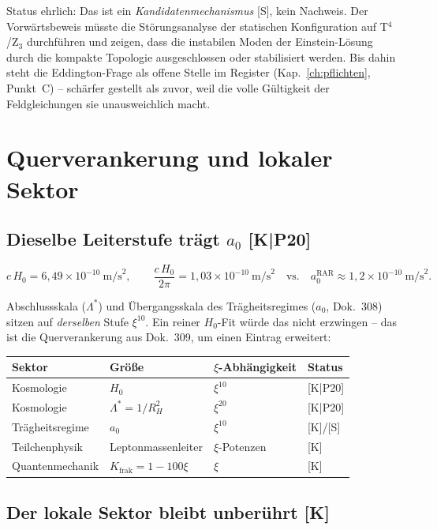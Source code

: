 \documentclass[11pt]{report}
\begin{document}
Status ehrlich: Das ist ein \emph{Kandidatenmechanismus} [S], kein
Nachweis. Der Vorwärtsbeweis müsste die Störungsanalyse der
statischen Konfiguration auf T$^4$/Z$_3$ durchführen und zeigen,
dass die instabilen Moden der Einstein-Lösung durch die kompakte
Topologie ausgeschlossen oder stabilisiert werden. Bis dahin steht
die Eddington-Frage als offene Stelle im Register (Kap.~\ref{ch:pflichten}, Punkt~C)
-- schärfer gestellt als zuvor, weil die volle Gültigkeit der
Feldgleichungen sie unausweichlich macht.

\chapter{Querverankerung und lokaler Sektor}

\section{Dieselbe Leiterstufe trägt $a_0$ [K|P20]}

\[
  c\,H_0 = 6{,}49\times10^{-10}~\text{m/s}^2,
  \qquad
  \frac{c\,H_0}{2\pi} = 1{,}03\times10^{-10}~\text{m/s}^2
  \quad\text{vs.}\quad
  a_0^\text{RAR} \approx 1{,}2\times10^{-10}~\text{m/s}^2.
\]

Abschlussskala ($\Lambda^{*}$) und Übergangsskala des
Trägheitsregimes ($a_0$, Dok.~308) sitzen auf \emph{derselben} Stufe
$\xi^{10}$. Ein reiner $H_0$-Fit würde das nicht erzwingen -- das ist
die Querverankerung aus Dok.~309, um einen Eintrag erweitert:

\begin{center}
\begin{tabular}{llll}
\toprule
Sektor & Größe & $\xi$-Abhängigkeit & Status \\
\midrule
Kosmologie & $H_0$ & $\xi^{10}$ & [K|P20] \\
Kosmologie & $\Lambda^{*} = 1/R_H^2$ & $\xi^{20}$ & [K|P20] \\
Trägheitsregime & $a_0$ & $\xi^{10}$ & [K]/[S] \\
Teilchenphysik & Leptonmassenleiter & $\xi$-Potenzen & [K] \\
Quantenmechanik & $K_\text{frak} = 1-100\xi$ & $\xi$ & [K] \\
\bottomrule
\end{tabular}
\end{center}

\section{Der lokale Sektor bleibt unberührt [K]}
\end{document}
